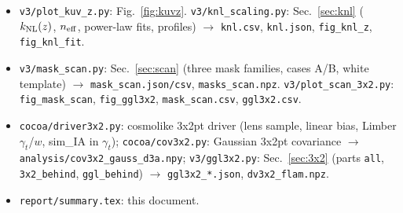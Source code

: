 \documentclass[11pt]{article}
\begin{document}
\begin{itemize}
\item \texttt{v3/plot\_kuv\_z.py}: Fig.~\ref{fig:kuvz}. \texttt{v3/knl\_scaling.py}: Sec.~\ref{sec:knl} ($k_{\rm NL}(z)$, $n_{\rm eff}$, power-law fits, profiles) $\rightarrow$ \texttt{knl.csv}, \texttt{knl.json}, \texttt{fig\_knl\_z}, \texttt{fig\_knl\_fit}.
\item \texttt{v3/mask\_scan.py}: Sec.~\ref{sec:scan} (three mask families, cases A/B, white template) $\rightarrow$ \texttt{mask\_scan.json/csv}, \texttt{masks\_scan.npz}. \texttt{v3/plot\_scan\_3x2.py}: \texttt{fig\_mask\_scan}, \texttt{fig\_ggl3x2}, \texttt{mask\_scan.csv}, \texttt{ggl3x2.csv}.
\item \texttt{cocoa/driver3x2.py}: cosmolike 3x2pt driver (lens sample, linear bias, Limber $\gamma_t$/$w$, sim\_IA in $\gamma_t$); \texttt{cocoa/cov3x2.py}: Gaussian 3x2pt covariance $\rightarrow$ \texttt{analysis/cov3x2\_gauss\_d3a.npy}; \texttt{v3/ggl3x2.py}: Sec.~\ref{sec:3x2} (parts \texttt{all}, \texttt{3x2\_behind}, \texttt{ggl\_behind}) $\rightarrow$ \texttt{ggl3x2\_*.json}, \texttt{dv3x2\_flam.npz}.
\item \texttt{report/summary.tex}: this document.
\end{itemize}
\end{document}
